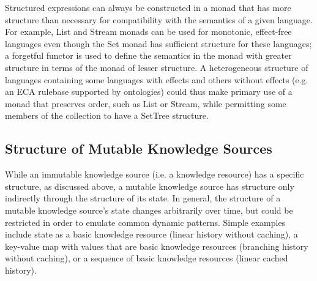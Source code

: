 \documentclass[runningheads]{llncs}
\begin{document}
Structured expressions can always be constructed in a monad that has more structure than necessary for compatibility with the semantics of a given language.
For example, List and Stream monads can be used for monotonic, effect-free languages even though the Set monad has sufficient structure for these languages;
a forgetful functor is used to define the semantics in the monad with greater structure in terms of the monad of lesser structure.
A heterogeneous structure of languages containing some languages with effects and others without effects (e.g. an ECA rulebase supported by ontologies) could thus make primary use of a monad that preserves order, such as List or Stream, while permitting some members of the collection to have a SetTree structure. 



\subsection{Structure of Mutable Knowledge Sources}
While an immutable knowledge source (i.e. a knowledge resource) has a specific structure, as discussed above, a mutable knowledge source has structure only indirectly through the structure of its state. In general, the structure of a mutable knowledge source's state changes arbitrarily over time, but could be restricted in order to emulate common dynamic patterns. Simple examples include state as a basic knowledge resource (linear history without caching), a key-value map with values that are basic knowledge resources (branching history without caching), or a sequence of basic knowledge resources (linear cached history). 
\end{document}
